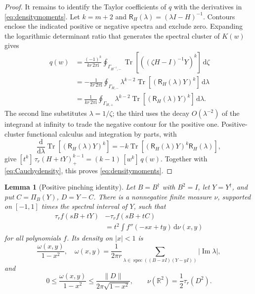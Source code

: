 \documentclass[aps,prl,reprint,superscriptaddress,longbibliography,floatfix,raggedbottom]{revtex4-2}
\newtheorem{lemma}{Lemma}
\newcommand{\R}{\mathbb R}
\newcommand{\ii}{\mathrm i}
\newcommand{\dd}{\,\mathrm d}
\newcommand{\norm}[1]{\lVert #1\rVert}
\newcommand{\abs}[1]{\lvert #1\rvert}
\DeclareMathOperator{\Tr}{Tr}
\DeclareMathOperator{\spec}{spec}
\newcommand{\tr}{\tau}
\begin{document}
\begin{proof}
It remains to identify the Taylor coefficients of $q$ with the
derivatives in \eqref{eq:densitymoments}. Let $k=m+2$ and
$\mathsf R_H(\lambda)=(\lambda I-H)^{-1}$. Contours enclose the
indicated positive or negative spectra and exclude zero. Expanding the
logarithmic determinant ratio that generates the spectral cluster of
$K(w)$ gives
\begin{align*}
[w^k]\,q(w)
&=\frac{(-1)^k}{kr\,2\pi\ii}
\oint_{\Gamma_{H^{-1},-}}
\Tr[((\zeta H-I)^{-1}Y)^k]\dd\zeta\\
&=-\frac1{kr\,2\pi\ii}
\oint_{\Gamma_{H,-}}
\lambda^{k-2}\Tr[(\mathsf R_H(\lambda)Y)^k]\dd\lambda\\
&=\frac1{kr\,2\pi\ii}
\oint_{\Gamma_{H,+}}
\lambda^{k-2}\Tr[(\mathsf R_H(\lambda)Y)^k]\dd\lambda .
\end{align*}
The second line substitutes $\lambda=1/\zeta$; the third uses the decay
$O(\lambda^{-2})$ of the integrand at infinity to trade the negative
contour for the positive one. Positive-cluster functional calculus and
integration by parts, with
\[
\frac{\mathrm d}{\mathrm d\lambda}\Tr[(\mathsf R_H(\lambda)Y)^k]
=-k\Tr[(\mathsf R_H(\lambda)Y)^k\mathsf R_H(\lambda)],
\]
give $[t^k]\,\tr_r(H+tY)_+^{k-1}=(k-1)\,[w^k]\,q(w)$. Together with
\eqref{eq:Cauchydensity}, this proves \eqref{eq:densitymoments}.
\end{proof}

\begin{lemma}[Positive pinching identity]\label{lem:pinching}
Let $B=B^\dagger$ with $B^2=I$, let $Y=Y^\dagger$, and put
$C=\Pi_B(Y)$, $D=Y-C$. There is a nonnegative finite measure $\nu$,
supported on $[-1,1]$ times the spectral interval of $Y$, such that
\begin{equation}\label{eq:pinching}
\begin{split}
\tr_rf(sB+tY)&-\tr_rf(sB+tC)\\
&=t^2\!\int f''(-sx+ty)\dd\nu(x,y)
\end{split}
\end{equation}
for all polynomials $f$. Its density on $\abs x<1$ is
\begin{equation}\label{eq:nudensity}
\frac{\omega(x,y)}{1-x^2},\quad
\omega(x,y)=\frac1{2\pi r}
\sum_{\lambda\in\spec((B-xI)(Y-yI))}\abs{\operatorname{Im}\lambda},
\end{equation}
and
\begin{equation}\label{eq:numajorant}
0\le\frac{\omega(x,y)}{1-x^2}
\le\frac{\norm D}{2\pi\sqrt{1-x^2}},\qquad
\nu(\R^2)=\frac12\tr_r(D^2).
\end{equation}
\end{lemma}
\end{document}
